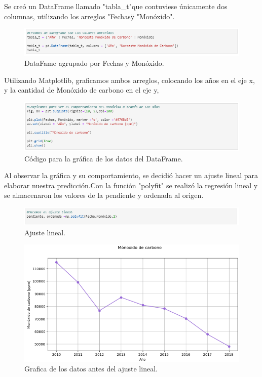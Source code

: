 \documentclass[12pt]{article}
\begin{document}
    Se creó un DataFrame llamado "tabla\_t"que contuviese únicamente dos columnas, utilizando los arreglos "Fechas\" y "Monóxido". 
         \begin{figure}[h!] 
          \centering 
            \includegraphics[width=12cm]{Pred9.png}
                \caption{DataFame agrupado por Fechas y Monóxido.}
                \label{fig:11}
                 \end{figure}
    
    Utilizando Matplotlib, graficamos ambos arreglos, colocando los años en el eje x, y la cantidad de Monóxido de carbono en el eje y, 
         \begin{figure}[h!] 
          \centering 
            \includegraphics[width=12 cm]{Pred10.png}
                \caption{Código para la gráfica de los datos del DataFrame.}
                \label{fig:12}
                 \end{figure}  
             
    
    Al observar la gráfica y  su comportamiento, se decidió hacer un ajuste lineal para elaborar nuestra predicción.Con la función "polyfit" se realizó la regresión lineal y se almacenaron los valores de la pendiente y ordenada al origen. 
         \begin{figure}[h!] 
          \centering 
            \includegraphics[width=12cm]{Pred12.png}
                \caption{Ajuste lineal.}
                \label{fig:13}
                 \end{figure}  
                       \begin{figure}[h] 
          \centering 
            \includegraphics[width=12cm]{Pred11.png}
                \caption{Grafica de los datos antes del ajuste lineal.}
                \label{fig:14}
                 \end{figure}  
             
\end{document}

